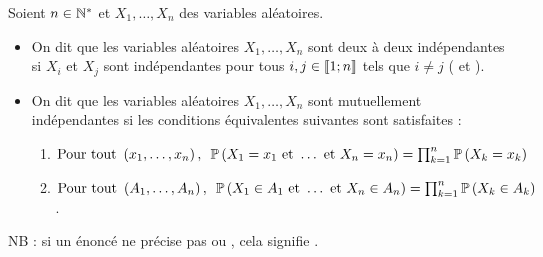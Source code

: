 \begin{defi}
Soient \(n\in\mathbb{N}^*\) et \(X_1,\dots,X_n\) des variables aléatoires.

\begin{itemize}
    \item On dit que les variables aléatoires \(X_1,\dots,X_n\) sont deux à deux indépendantes si \(X_i\) et \(X_j\) sont indépendantes pour tous \(i,j\in\left\llbracket1;n\right\rrbracket\) tels que \(i\not=j\) (\cf {} et ). \\
    \item On dit que les variables aléatoires \(X_1,\dots,X_n\) sont mutuellement indépendantes si les conditions équivalentes suivantes sont satisfaites : \begin{enumerate}
        \item \(\quantifs{\text{Pour tout }\paren{x_1,\dots,x_n}}\proba{X_1=x_1\text{ et }\dots\text{ et }X_n=x_n}=\prod_{k=1}^n\proba{X_k=x_k}\) \\
        \item \(\quantifs{\text{Pour tout }\paren{A_1,\dots,A_n}}\proba{X_1\in A_1\text{ et }\dots\text{ et }X_n\in A_n}=\prod_{k=1}^n\proba{X_k\in A_k}\).
    \end{enumerate}
\end{itemize}

NB : si un énoncé ne précise pas  ou , cela signifie .
\end{defi}